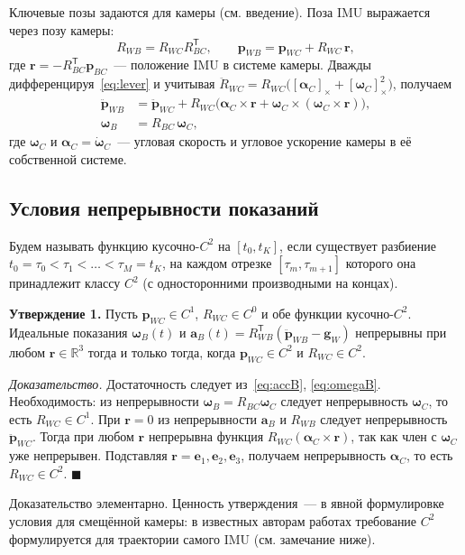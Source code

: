 \documentclass{misisarticle}
\newcommand{\cross}[1]{[#1]_{\times}}
\newcommand{\R}{\mathbb{R}}
\newcommand{\T}{^{\mathsf{T}}}
\newcommand{\vb}[1]{\mathbf{#1}}
\begin{document}
Ключевые позы задаются для камеры (см. введение). Поза IMU выражается через позу камеры:
\begin{equation}
  R_{WB}=R_{WC}R_{BC}\T,\qquad
  \vb p_{WB}=\vb p_{WC}+R_{WC}\,\vb r,
  \label{eq:lever}
\end{equation}
где $\vb r=-R_{BC}\T\vb p_{BC}$~--- положение IMU в системе камеры. Дважды дифференцируя~\eqref{eq:lever} и учитывая $\ddot R_{WC}=R_{WC}\bigl(\cross{\boldsymbol\alpha_C}+\cross{\boldsymbol\omega_C}^2\bigr)$, получаем
\begin{align}
  \ddot{\vb p}_{WB} &= \ddot{\vb p}_{WC}
     + R_{WC}\bigl(\boldsymbol\alpha_C\times\vb r
     + \boldsymbol\omega_C\times(\boldsymbol\omega_C\times\vb r)\bigr), \label{eq:accB}\\
  \boldsymbol\omega_B &= R_{BC}\,\boldsymbol\omega_C, \label{eq:omegaB}
\end{align}
где $\boldsymbol\omega_C$ и $\boldsymbol\alpha_C=\dot{\boldsymbol\omega}_C$~--- угловая скорость и угловое ускорение камеры в её собственной системе.

\subsection{Условия непрерывности показаний}

Будем называть функцию кусочно-$C^2$ на $[t_0,t_K]$, если существует разбиение $t_0=\tau_0<\tau_1<\dots<\tau_M=t_K$, на каждом отрезке $[\tau_m,\tau_{m+1}]$ которого она принадлежит классу $C^2$ (с односторонними производными на концах).

\textbf{Утверждение 1.} Пусть $\vb p_{WC}\in C^1$, $R_{WC}\in C^0$ и обе функции кусочно-$C^2$. Идеальные показания $\boldsymbol\omega_B(t)$ и $\vb a_B(t)=R_{WB}\T(\ddot{\vb p}_{WB}-\vb g_W)$ непрерывны при любом $\vb r\in\R^3$ тогда и только тогда, когда $\vb p_{WC}\in C^2$ и $R_{WC}\in C^2$.

\textit{Доказательство.} Достаточность следует из~\eqref{eq:accB}, \eqref{eq:omegaB}. Необходимость: из непрерывности $\boldsymbol\omega_B=R_{BC}\boldsymbol\omega_C$ следует непрерывность $\boldsymbol\omega_C$, то есть $R_{WC}\in C^1$. При $\vb r=0$ из непрерывности $\vb a_B$ и $R_{WB}$ следует непрерывность $\ddot{\vb p}_{WC}$. Тогда при любом $\vb r$ непрерывна функция $R_{WC}(\boldsymbol\alpha_C\times\vb r)$, так как член с $\boldsymbol\omega_C$ уже непрерывен. Подставляя $\vb r=\vb e_1,\vb e_2,\vb e_3$, получаем непрерывность $\boldsymbol\alpha_C$, то есть $R_{WC}\in C^2$. $\blacksquare$

Доказательство элементарно. Ценность утверждения~--- в явной формулировке условия для смещённой камеры: в известных авторам работах требование $C^2$ формулируется для траектории самого IMU (см. замечание ниже).
\end{document}
